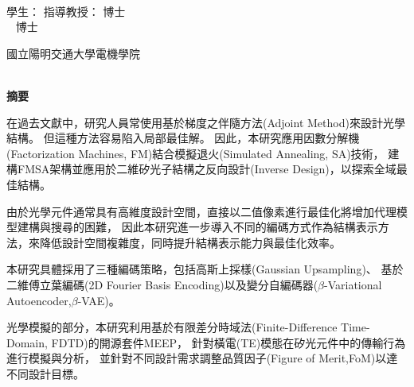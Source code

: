 \begin{center}
    \large
    \begin{singlespace}    
        \textbf{\chineseTitle{}} \\[0.5cm]
    \end{singlespace}

    \begin{singlespace}    
    學生：\studentCnName  \hspace{2.5cm}  指導教授：\advisorCnName \hspace{0.1cm} 博士 \\

    \ifdefined\advisorCnNameB %
        \hspace{9.6cm}  \advisorCnNameB ~ 博士 \\
    \fi
    \end{singlespace}

    \vspace{0.5cm}

    \begin{singlespace}
        國立陽明交通大學電機學院\\
        \NameofDepartmentInstituteCN\\[0.2cm]
    \end{singlespace}

    \textbf{摘\hspace{1cm}要} \\[0.5cm]

\end{center}

\normalsize 

在過去文獻中，研究人員常使用基於梯度之伴隨方法(Adjoint Method)來設計光學結構。
但這種方法容易陷入局部最佳解。
因此，本研究應用因數分解機(Factorization Machines, FM)結合模擬退火(Simulated Annealing, SA)技術，
建構FMSA架構並應用於二維矽光子結構之反向設計(Inverse Design)，以探索全域最佳結構。

由於光學元件通常具有高維度設計空間，直接以二值像素進行最佳化將增加代理模型建構與搜尋的困難，
因此本研究進一步導入不同的編碼方式作為結構表示方法，來降低設計空間複雜度，同時提升結構表示能力與最佳化效率。

本研究具體採用了三種編碼策略，包括高斯上採樣(Gaussian Upsampling)、
基於二維傅立葉編碼(2D Fourier Basis Encoding)以及變分自編碼器($\beta$-Variational Autoencoder,$\beta$-VAE)。

光學模擬的部分，本研究利用基於有限差分時域法(Finite-Difference Time-Domain, FDTD)的開源套件MEEP，
針對橫電(TE)模態在矽光元件中的傳輸行為進行模擬與分析，
並針對不同設計需求調整品質因子(Figure of Merit,FoM)以達不同設計目標。

